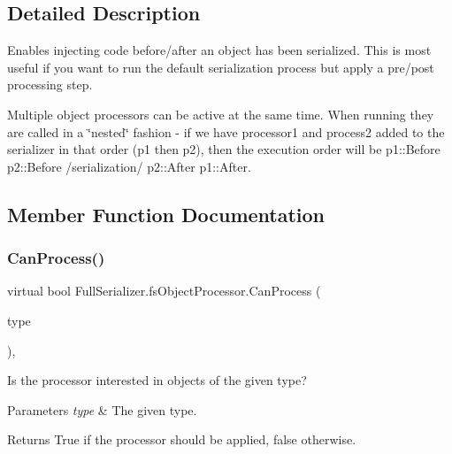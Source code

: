 \subsection{Detailed Description}


Enables injecting code before/after an object has been serialized. This is most useful if you want to run the default serialization process but apply a pre/post processing step. 

Multiple object processors can be active at the same time. When running they are called in a \char`\"{}nested\char`\"{} fashion -\/ if we have processor1 and process2 added to the serializer in that order (p1 then p2), then the execution order will be p1\+::\+Before p2\+::\+Before /serialization/ p2\+::\+After p1\+::\+After. 

\subsection{Member Function Documentation}
\mbox{\label{class_full_serializer_1_1fs_object_processor_a5dc981f868302d15a59def67ed4e8a5d}} 
\subsubsection{\texorpdfstring{Can\+Process()}{CanProcess()}}
{\footnotesize\ttfamily virtual bool Full\+Serializer.\+fs\+Object\+Processor.\+Can\+Process (\begin{DoxyParamCaption}\item[{Type}]{type }\end{DoxyParamCaption})\hspace{0.3cm}{\ttfamily [inline]}, {\ttfamily [virtual]}}



Is the processor interested in objects of the given type? 


\begin{DoxyParams}{Parameters}
{\em type} & The given type.\\
\hline
\end{DoxyParams}
\begin{DoxyReturn}{Returns}
True if the processor should be applied, false otherwise.
\end{DoxyReturn}


